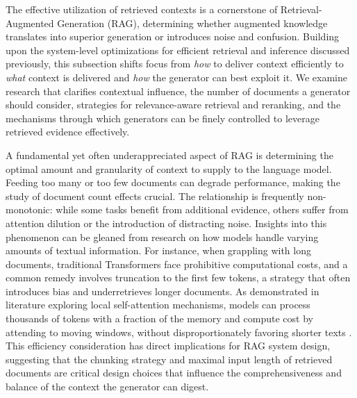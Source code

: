 \documentclass[11pt]{article}
\begin{document}
The effective utilization of retrieved contexts is a cornerstone of Retrieval-Augmented Generation (RAG), determining whether augmented knowledge translates into superior generation or introduces noise and confusion. Building upon the system-level optimizations for efficient retrieval and inference discussed previously, this subsection shifts focus from \emph{how} to deliver context efficiently to \emph{what} context is delivered and \emph{how} the generator can best exploit it. We examine research that clarifies contextual influence, the number of documents a generator should consider, strategies for relevance-aware retrieval and reranking, and the mechanisms through which generators can be finely controlled to leverage retrieved evidence effectively.

A fundamental yet often underappreciated aspect of RAG is determining the optimal amount and granularity of context to supply to the language model. Feeding too many or too few documents can degrade performance, making the study of document count effects crucial. The relationship is frequently non-monotonic: while some tasks benefit from additional evidence, others suffer from attention dilution or the introduction of distracting noise. Insights into this phenomenon can be gleaned from research on how models handle varying amounts of textual information. For instance, when grappling with long documents, traditional Transformers face prohibitive computational costs, and a common remedy involves truncation to the first few tokens, a strategy that often introduces bias and underretrieves longer documents. As demonstrated in literature exploring local self-attention mechanisms, models can process thousands of tokens with a fraction of the memory and compute cost by attending to moving windows, without disproportionately favoring shorter texts \cite{ref65}. This efficiency consideration has direct implications for RAG system design, suggesting that the chunking strategy and maximal input length of retrieved documents are critical design choices that influence the comprehensiveness and balance of the context the generator can digest.
\end{document}
